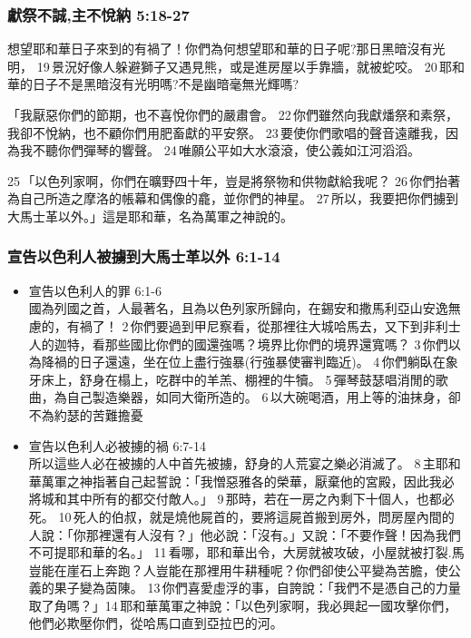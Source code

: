 




\subsubsection{獻祭不誠,主不悅納 5:18-27}
想望耶和華日子來到的有禍了！你們為何想望耶和華的日子呢?那日黑暗沒有光明， 19 景況好像人躲避獅子又遇見熊，或是進房屋以手靠牆，就被蛇咬。 20 耶和華的日子不是黑暗沒有光明嗎?不是幽暗毫無光輝嗎?

「我厭惡你們的節期，也不喜悅你們的嚴肅會。 22 你們雖然向我獻燔祭和素祭，我卻不悅納，也不顧你們用肥畜獻的平安祭。 23 要使你們歌唱的聲音遠離我，因為我不聽你們彈琴的響聲。 24 唯願公平如大水滾滾，使公義如江河滔滔。

25 「以色列家啊，你們在曠野四十年，豈是將祭物和供物獻給我呢？ 26 你們抬著為自己所造之摩洛的帳幕和偶像的龕，並你們的神星。 27 所以，我要把你們擄到大馬士革以外。」這是耶和華，名為萬軍之神說的。


\subsubsection{宣告以色利人被擄到大馬士革以外 6:1-14}
\begin{itemize} 
\itemsep-.5em 
\item 宣告以色利人的罪 6:1-6\\
國為列國之首，人最著名，且為以色列家所歸向，在錫安和撒馬利亞山安逸無慮的，有禍了！ 2 你們要過到甲尼察看，從那裡往大城哈馬去，又下到非利士人的迦特，看那些國比你們的國還強嗎？境界比你們的境界還寬嗎？ 3 你們以為降禍的日子還遠，坐在位上盡行強暴(行強暴使審判臨近)。 4 你們躺臥在象牙床上，舒身在榻上，吃群中的羊羔、棚裡的牛犢。 5 彈琴鼓瑟唱消閒的歌曲，為自己製造樂器，如同大衛所造的。 6 以大碗喝酒，用上等的油抹身，卻不為約瑟的苦難擔憂
\item 宣告以色利人必被擄的禍 6:7-14\\
所以這些人必在被擄的人中首先被擄，舒身的人荒宴之樂必消滅了。 8 主耶和華萬軍之神指著自己起誓說：「我憎惡雅各的榮華，厭棄他的宮殿，因此我必將城和其中所有的都交付敵人。」 9 那時，若在一房之內剩下十個人，也都必死。 10 死人的伯叔，就是燒他屍首的，要將這屍首搬到房外，問房屋內間的人說：「你那裡還有人沒有？」他必說：「沒有。」又說：「不要作聲！因為我們不可提耶和華的名。」 11 看哪，耶和華出令，大房就被攻破，小屋就被打裂.馬豈能在崖石上奔跑？人豈能在那裡用牛耕種呢？你們卻使公平變為苦膽，使公義的果子變為茵陳。 13 你們喜愛虛浮的事，自誇說：「我們不是憑自己的力量取了角嗎？」14 耶和華萬軍之神說：「以色列家啊，我必興起一國攻擊你們，他們必欺壓你們，從哈馬口直到亞拉巴的河。
\end{itemize}




